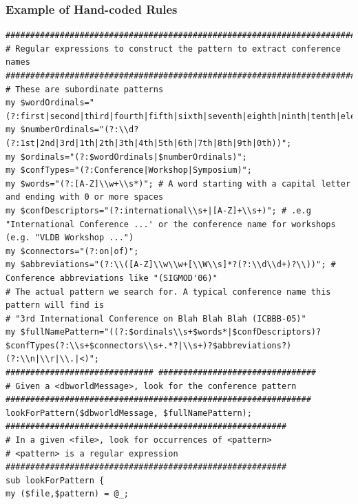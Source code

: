 \documentclass{beamer}
\begin{document}
\begin{frame}[fragile]
  \frametitle{Example of Hand-coded Rules}
  \tiny
\begin{verbatim}
#############################################################################
# Regular expressions to construct the pattern to extract conference names
#############################################################################
# These are subordinate patterns
my $wordOrdinals="(?:first|second|third|fourth|fifth|sixth|seventh|eighth|ninth|tenth|eleventh|twelfth|thirteenth|fourteenth|fifteenth)";
my $numberOrdinals="(?:\\d?(?:1st|2nd|3rd|1th|2th|3th|4th|5th|6th|7th|8th|9th|0th))";
my $ordinals="(?:$wordOrdinals|$numberOrdinals)";
my $confTypes="(?:Conference|Workshop|Symposium)";
my $words="(?:[A-Z]\\w+\\s*)"; # A word starting with a capital letter and ending with 0 or more spaces
my $confDescriptors="(?:international\\s+|[A-Z]+\\s+)"; # .e.g "International Conference ...' or the conference name for workshops (e.g. "VLDB Workshop ...")
my $connectors="(?:on|of)";
my $abbreviations="(?:\\([A-Z]\\w\\w+[\\W\\s]*?(?:\\d\\d+)?\\))"; # Conference abbreviations like "(SIGMOD'06)"
# The actual pattern we search for. A typical conference name this pattern will find is
# "3rd International Conference on Blah Blah Blah (ICBBB-05)"
my $fullNamePattern="((?:$ordinals\\s+$words*|$confDescriptors)?$confTypes(?:\\s+$connectors\\s+.*?|\\s+)?$abbreviations?)(?:\\n|\\r|\\.|<)";
############################## ################################
# Given a <dbworldMessage>, look for the conference pattern
##############################################################
lookForPattern($dbworldMessage, $fullNamePattern);
#########################################################
# In a given <file>, look for occurrences of <pattern>
# <pattern> is a regular expression
#########################################################
sub lookForPattern {
my ($file,$pattern) = @_;
\end{verbatim}
\end{frame}
\end{document}

